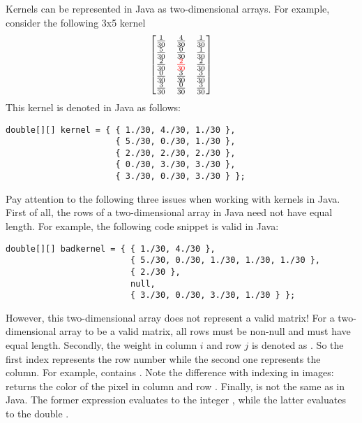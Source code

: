 \documentclass{book}
\begin{document}
Kernels can be represented in Java as two-dimensional arrays. For example, consider the following 3x5 kernel 
$$
 \begin{bmatrix}
  \frac{1}{30} & \frac{4}{30} & \frac{1}{30} \\
  \frac{5}{30} & \frac{0}{30} & \frac{1}{30} \\
  \frac{2}{30} & \textcolor{red}{\frac{2}{30}} & \frac{2}{30}\\
  \frac{0}{30} & \frac{3}{30} & \frac{3}{30}\\
  \frac{3}{30} & \frac{0}{30} & \frac{3}{30}\\
 \end{bmatrix}
$$
This kernel is denoted in Java as follows:
\begin{lstlisting}
double[][] kernel = { { 1./30, 4./30, 1./30 },
                      { 5./30, 0./30, 1./30 },
                      { 2./30, 2./30, 2./30 },
                      { 0./30, 3./30, 3./30 },
                      { 3./30, 0./30, 3./30 } };
\end{lstlisting}
Pay attention to the following three issues when working with kernels in Java. First of all, the rows of a two-dimensional array in Java need not have equal length. For example, the following code snippet is valid in Java:
\begin{lstlisting}
double[][] badkernel = { { 1./30, 4./30 },
                         { 5./30, 0./30, 1./30, 1./30, 1./30 },
                         { 2./30 },
                         null,
                         { 3./30, 0./30, 3./30, 1./30 } };
\end{lstlisting}
However, this two-dimensional array does not represent a valid matrix! For a two-dimensional array to be a valid matrix, all rows must be non-null and must have equal length. Secondly, the weight in column $i$ and row $j$ is denoted as . So the first index represents the row number while the second one represents the column. For example,  contains . Note the difference with indexing in images:  returns the color of the pixel in column  and row . Finally,  is not the same as  in Java. The former expression evaluates to the integer , while the latter evaluates to the double .
\end{document}
